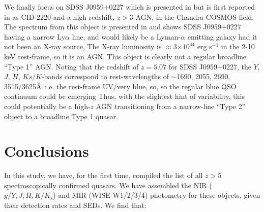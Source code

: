 \documentclass[usenatbib]{mnras}
\begin{document}
We finally focus on SDSS J0959+0227 which is presented in
\citet{WangF2016} but is first reported in \citet{Civano2011} as
CID-2220 and a high-redshift, $z>3$ AGN, in the Chandra-COSMOS
field. The spectrum from this object is presented in \citet{Ikeda2012}
and shows SDSS J0959+0227 having a narrow Ly$\alpha$ line, and would
likely be a Lyman-$\alpha$ emitting galaxy had it not been an X-ray
source, The X-ray luminosity is $\approx$3$\times10^{44}$ erg s$^{-1}$
in the 2-10 keV rest-frame, so it is an AGN. This object is clearly
not a regular broadline ``Type 1'' AGN. Noting that the redshift of
$z=5.07$ for SDSS J0959+0227, the $Y$, $J$, $H$, $Ks/K$-bands
correspond to rest-wavelengths of $\sim$1690, 2055, 2690,
3515/3625\AA\ i.e. the rest-frame UV/very blue, so, so the regular
blue QSO continuum could be emerging Thus, with the slightest hint of
variability, this could potentially be a high-$z$ AGN transitioning
from a narrow-line ``Type 2'' object to a broadline Type 1 quasar.







\section{Conclusions}\label{sec:conclusions}
In this study, we have, for the first time, compiled the list of all
$z>5$ spectroscopically confirmed quasars. We have assembled the NIR
($y/Y, J, H, K/K_{s}$) and MIR (WISE W1/2/3/4) photometry for these
objects, given their detection rates and SEDs. We find that: 
\end{document}
